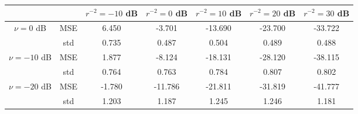 \begin{tabular}{ccccccc}
\toprule
             &     &  $r^{-2}=-10$ dB &  $r^{-2}=0$ dB &  $r^{-2}=10$ dB &  $r^{-2}=20$ dB &  $r^{-2}=30$ dB \\
\midrule
$\nu=0$ dB & MSE &            6.450 &         -3.701 &         -13.690 &         -23.700 &         -33.722 \\
             & std &            0.735 &          0.487 &           0.504 &           0.489 &           0.488 \\ \hline
$\nu=-10$ dB & MSE &            1.877 &         -8.124 &         -18.131 &         -28.120 &         -38.115 \\
             & std &            0.764 &          0.763 &           0.784 &           0.807 &           0.802 \\ \hline
$\nu=-20$ dB & MSE &           -1.780 &        -11.786 &         -21.811 &         -31.819 &         -41.777 \\
             & std &            1.203 &          1.187 &           1.245 &           1.246 &           1.181 \\
\bottomrule
\end{tabular}
